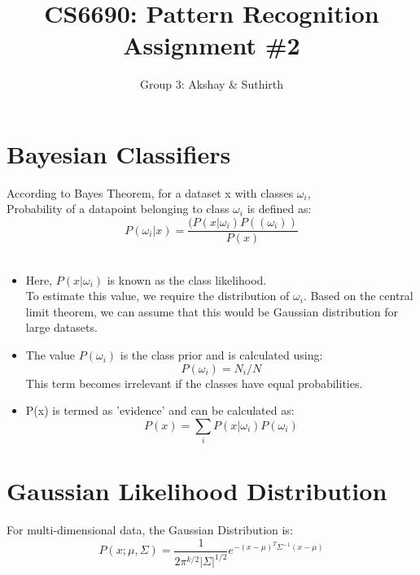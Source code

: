 \documentclass[11pt,a4paper]{article}
\begin{document}
\title{CS6690: Pattern Recognition Assignment \#2}
\author{Group 3: Akshay \& Suthirth}
\maketitle

\newpage

\section{Bayesian Classifiers}
According to Bayes Theorem, for a dataset x with classes $\omega_i$, \\
Probability of a datapoint belonging to class $\omega_i$ is defined as: \\
\begin{equation}
P(\omega_i | x) = \frac{(P(x|\omega_i)P((\omega_i))}{P(x)}
\end{equation}
\\ 

\begin{itemize}

	\item Here, $P(x|\omega_i)$ is known as the class likelihood. 
\\ To estimate this value, we require the distribution of $\omega_i$.
Based on the central limit theorem, we can assume that this would be Gaussian distribution for large datasets. 

	\item The value $P(\omega_i)$ is the class prior and is calculated using:
		\begin{equation}
		P(\omega_i) = N_i / N  
		\end{equation}
	This term becomes irrelevant if the classes have equal probabilities. 

	\item P(x) is termed as 'evidence' and can be calculated as:
	\begin{equation}
	{P(x) = \sum_i P(x | \omega_i)P(\omega_i)}
	\end{equation}
\end{itemize}

\section{Gaussian Likelihood Distribution}
 
 For multi-dimensional data, the Gaussian Distribution is:   
 \begin{equation}
 P(x;\mu,\Sigma) = \frac{1}{2\pi^{k/2}|\Sigma|^{1/2}} e^{-(x-\mu)^{T} \Sigma^{-1} (x-\mu)}
 \end{equation}
 
\end{document}
